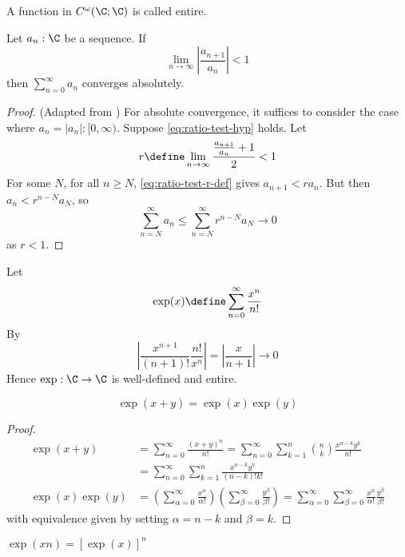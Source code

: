 \documentclass[10pt]{scrartcl}
\numberwithin{thms}{section}
\begin{document}
\begin{defn}
  A function in $C^\omega(\C;\C)$ is called entire. 
\end{defn}

\begin{lemma}
  \label{ratio-test}
  Let $a_n:\C$ be a sequence. If
  \begin{equation}
    \label{eq:ratio-test-hyp}
    \lim_{n\to \infty} \left|\frac{a_{n+1}}{a_n}\right| <1
  \end{equation}
  then $\sum_{n=0}^\infty a_n$ converges absolutely.
  \cite{wiki:ratio-test}
\end{lemma}
\begin{proof}
  (Adapted from \cite{wiki:ratio-test})
  For absolute convergence, it suffices to consider the case where $a_n = |a_n|:[0,\infty)$. Suppose \cref{eq:ratio-test-hyp} holds. Let
  \begin{equation}
    \label{eq:ratio-test-r-def}
  r\define \lim_{n\to \infty} \frac{\frac{a_{n+1}}{a_n} +1}{2}<1
  \end{equation}
  For some $N$, for all $n\geq N$, \cref{eq:ratio-test-r-def} gives $a_{n+1}<r a_n$. But then $a_{n}<r^{n-N}a_N$, so
  \[
  \sum_{n=N}^\infty a_n \leq \sum_{n=N}^\infty r^{n-N}a_N\to 0
  \]
  as $r<1$. 
\end{proof}

\begin{defn}[$\exp$]
  Let
  \[
  \exp(x) \define \sum_{n=0}^\infty \frac{x^n}{n!}
  \]
  By 
  \[
  \left |\frac {x^{n+1}}{(n+1)!}\frac{n!}{x^n} \right|=\left|\frac x {n+1} \right|\to 0
  \]
  Hence $\exp:\C\to\C$ is well-defined and entire.  
\end{defn}

\begin{lemma}
  \[
  \exp(x+y)=\exp(x)\exp(y)
  \]
\end{lemma}
\begin{proof}
  \begin{align*}
    \exp(x+y)&=\sum_{n=0}^\infty \frac{(x+y)^n}{n!}
             =\sum_{n=0}^\infty  \sum_{k=1}^n  {n \choose k} \frac{x^{n-k}y^k}{n!} \\
             &=\sum_{n=0}^\infty  \sum_{k=1}^n  \frac{x^{n-k}y^k}{(n-k)!k!} \\ 
    \exp(x)\exp(y)&=\left(\sum_{\alpha=0}^\infty \frac{x^\alpha}{\alpha!} \right)\left(\sum_{\beta=0}^\infty \frac{y^\beta}{\beta!}\right) =\sum_{\alpha=0}^\infty\sum_{\beta=0}^\infty \frac{x^\alpha}{\alpha!}\frac{y^\beta}{\beta!}
  \end{align*}
  with equivalence given by setting $\alpha=n-k$ and $\beta=k$.
\end{proof}
\begin{cor}
  $\exp(xn)=[\exp(x)]^n$
\end{cor}
\end{document}
